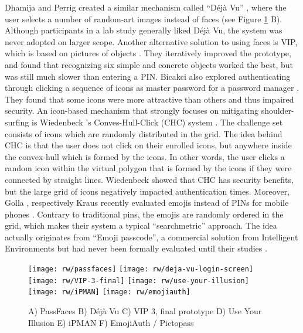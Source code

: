 	Dhamija and Perrig created a similar mechanism called ``Déjà Vu'' \cite{Dhamija2000DejaVu}, where the user selects a number of random-art images instead of faces (see Figure \ref{fig:rw:searchmetric} B). Although participants in a lab study generally liked Déjà Vu, the system was never adopted on larger scope. Another alternative solution to using faces is VIP, which is based on pictures of objects \cite{DeAngeli2002VIP, DeAngeli2005PictureThousandWords}. They iteratively improved the prototype, and found that recognizing six simple and concrete objects worked the best, but was still much slower than entering a PIN. Bicakci \etal also explored authenticating through clicking a sequence of icons as master password for a password manager \cite{Bicakci2011PWMIconBased}. They found that some icons were more attractive than others and thus impaired security. An icon-based mechanism that strongly focuses on mitigating shoulder-surfing is Wiedenbeck \etal's Conves-Hull-Click (CHC) system \cite{Wiedenbeck2006ConvexHull}. The challenge set consists of icons which are randomly distributed in the grid. The idea behind CHC is that the user does not click on their enrolled icons, but anywhere inside the convex-hull which is formed by the icons. In other words, the user clicks a random icon within the virtual polygon that is formed by the icons if they were connected by straight lines. Wiedenbeck \etal showed that CHC has security benefits, but the large grid of icons negatively impacted authentication times. Moreover, Golla \etal, respectively Kraus \etal recently evaluated emojis instead of PINs for mobile phones \cite{Golla2017EmojiAuth, Kraus2017Emoji}. Contrary to traditional pins, the emojis are randomly ordered in the grid, which makes their system a typical ``searchmetric'' approach. The idea actually originates from ``Emoji passcode'', a commercial solution from Intelligent Environments but had never been formally evaluated until their studies . 
	
	\begin{figure}[htbp]
		\centering
		\texttt{[image: rw/passfaces]}
		\texttt{[image: rw/deja-vu-login-screen]}
		\texttt{[image: rw/VIP-3-final]}
		\texttt{[image: rw/use-your-illusion]}
		\texttt{[image: rw/iPMAN]}
		\texttt{[image: rw/emojiauth]}
		\caption{\label{fig:rw:searchmetric} A) PassFaces B) Déjà Vu C) VIP 3, final prototype D) Use Your Illusion E) iPMAN F) EmojiAuth / Pictopass}
	\end{figure}
	
